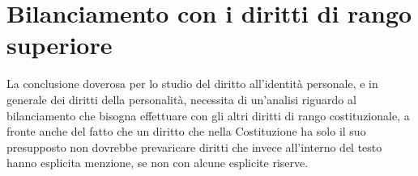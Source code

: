 \begin{comment}
Infine, è curioso menzionare brevemente il richiamo al diritto all'immagine. Le corti nazionali recepiscono l'\textit{immagine} non tanto come insieme di elementi costitutivi della \textit{persona}, quanto più come elementi costitutivi del suo assetto \textit{morale}, quasi configurandosi come concetto intermedio fra identità personale e reputazione. 
\\La differenza sostanziale, ancora una volta, si rinviene nell'aspetto "valutativo" della questione: infatti insinuando tale presupposto nel diritto all'identità personale, la differenza con la reputazione e col diritto all'immagine finisce per dissolversi; rifiutando invece tale assetto, è nettamente più evidente anche la differenza nella \textit{ratio} che sta dietro alle diverse tutele.\end{comment}

\section{Bilanciamento con i diritti di rango superiore} %


La conclusione doverosa per lo studio del diritto all'identità personale, e in generale dei diritti della personalità, necessita di un'analisi riguardo al bilanciamento che bisogna effettuare con gli altri diritti di rango costituzionale, a fronte anche del fatto che un diritto che nella Costituzione ha solo il suo presupposto non dovrebbe prevaricare diritti che invece all'interno del testo hanno esplicita menzione, se non con alcune esplicite riserve.

